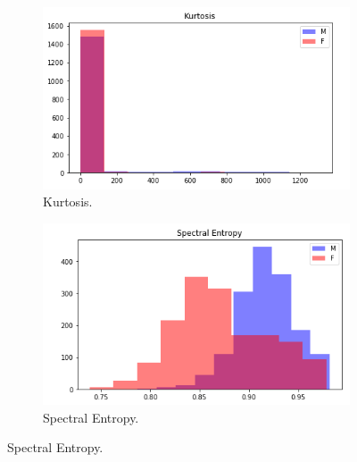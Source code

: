 \documentclass[12pt]{article}
\begin{document}
\begin{figure}[H]
	\centering
	\begin{subfigure}{0.49\linewidth}
		\centering
		\includegraphics[width=\linewidth]{images/hist_kurtosis.png}
		\caption{Kurtosis.}
		\label{fig:hist_kurtosis}
	\end{subfigure}
	\begin{subfigure}{0.49\linewidth}
		\centering
		\includegraphics[width=\linewidth]{images/hist_se.png}
		\caption{Spectral Entropy.}
		\label{fig:hist_se}
	\end{subfigure}
	\hfill
	

\end{figure}
\end{document}
